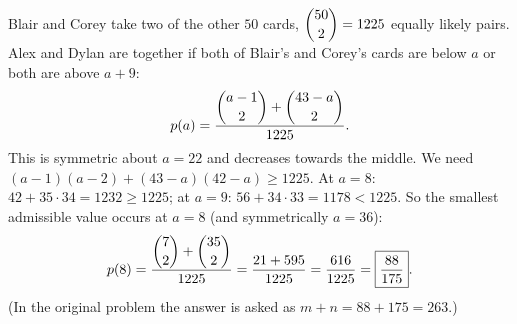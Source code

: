 Blair and Corey take two of the other $50$ cards, $\dbinom{50}2=1225$ equally likely pairs. Alex and Dylan are together if both of Blair's and Corey's cards are below $a$ or both are above $a+9$:
\[
p(a)=\dfrac{\dbinom{a-1}2+\dbinom{43-a}2}{1225}.
\]
This is symmetric about $a=22$ and decreases towards the middle. We need $(a-1)(a-2)+(43-a)(42-a)\ge1225$. At $a=8$: $42+35\cdot34=1232\ge1225$; at $a=9$: $56+34\cdot33=1178<1225$. So the smallest admissible value occurs at $a=8$ (and symmetrically $a=36$):
\[
p(8)=\dfrac{\dbinom72+\dbinom{35}2}{1225}=\dfrac{21+595}{1225}=\dfrac{616}{1225}=\boxed{\dfrac{88}{175}}.
\]
(In the original problem the answer is asked as $m+n=88+175=263$.)
